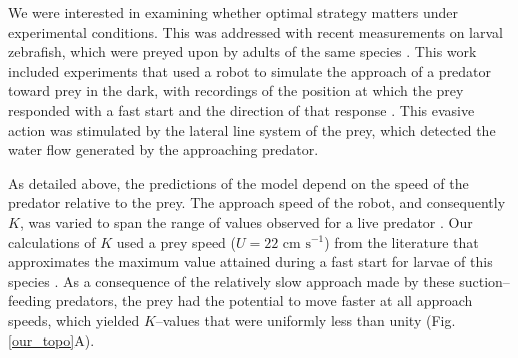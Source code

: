 \documentclass[12pt]{article}
\begin{document}
We were interested in examining whether optimal strategy matters under experimental conditions. This was addressed with recent  measurements on larval zebrafish, which were preyed upon by adults of the same species \citep{Stewart:2013bh}. 
This work included experiments that used a robot to simulate the approach of a predator toward prey in the dark, with recordings of the position at which the prey responded with a fast start and the direction of that response \citep{Stewart:2014cm}. 
This evasive action was stimulated by the lateral line system of the prey, which detected the water flow generated by the approaching predator. 

As detailed above, the predictions of the model depend on the speed of the predator relative to the prey. The approach speed of the robot, and consequently $K$, was varied to span the range of values observed for a live predator \citep{Stewart:2013bh}. 
Our calculations of $K$ used a prey speed ($U=22 \text{ cm s}^{-1}$) from the literature that approximates the maximum value attained during a fast start for larvae of this species \citep{Budick:2000wrb, Muller:2004hp}. 
As a consequence of the relatively slow approach made by these suction--feeding predators, the prey had the potential to move faster at all approach speeds, which yielded $K$--values that were uniformly less than unity (Fig. \ref{our_topo}A).
\end{document}
